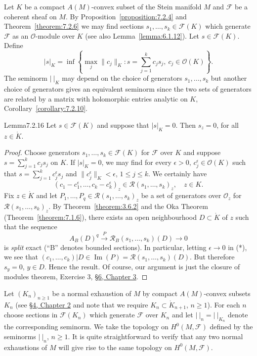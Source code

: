 Let $K$ be a compact $A(M)$-convex subset of the Stein manifold $M$ and $\mathcal F$ be a coherent sheaf on $M$. By Proposition~\ref{proposition:7.2.4} and Theorem~\ref{theorem:7.2.6} we may find sections $s_1,\ldots,s_k\in\mathcal F(K)$ which generate $\mathcal F$ as an $\mathcal O$-module over $K$ (see also Lemma~\ref{lemma:6.1.12}). Let $s\in\mathcal F(K)$. Define
\[
|s|_K=\inf\left\{\max_j\|c_j\|_K:s=\sum_{j=1}^k c_js_j,\ c_j\in\mathcal O(K)\right\}.
\]
The seminorm $|\ | _K$ may depend on the choice of generators $s_1,\ldots,s_k$ but another choice of generators gives an equivalent seminorm since the two sets of generators are related by a matrix with holomorphic entries analytic on $K$, Corollary~\ref{corollary:7.2.10}.
\begin{originaltheorem}{Lemma}{7.2.16}
Let $s\in\mathcal F(K)$ and suppose that $|s|_K=0$. Then $s_z=0$, for all $z\in\mathring K$.
\end{originaltheorem}
\begin{proof}
Choose generators $s_1,\ldots,s_k\in\mathcal F(K)$ for $\mathcal F$ over $K$ and suppose $s=\sum_{j=1}^k c_js_j$ on $K$. If $|s|_K=0$, we may find for every $\epsilon>0$, $c_j^\epsilon\in\mathcal O(K)$ such that $s=\sum_{j=1}^k c_j^\epsilon s_j$ and $\|c_j^\epsilon\|_K<\epsilon$, $1\leq j\leq k$. We certainly have
\[
(c_1-c_1^\epsilon,\ldots,c_k-c_k^\epsilon)_z\in\mathcal R(s_1,\ldots,s_k)_z,\quad z\in K.\tag{*}\label{eq:7:star:3}
\]
Fix $z\in\mathring K$ and let $P_1,\ldots,P_q\in\mathcal R(s_1,\ldots,s_k)_z$ be a set of generators over $\mathcal O_z$ for $\mathcal R(s_1,\ldots,s_k)_z$. By Theorem~\ref{theorem:3.6.2} and the Oka Theorem
(Theorem~\ref{theorem:7.1.6}), there exists an open neighbourhood $D\subset\mathring K$ of $z$ such that the sequence
\[
A_B(D)^q\xrightarrow{P}\mathcal R_B(s_1,\ldots,s_k)(D)\to0
\]
is \emph{split} exact (``B'' denotes bounded sections). In particular, letting $\epsilon\to0$ in (*), we see that $(c_1,\ldots,c_k)|D\in\operatorname{Im}(P)=\mathcal R(s_1,\ldots,s_k)(D)$. But therefore $s_y=0$, $y\in D$. Hence the result. Of course, our argument is just the closure of modules theorem, Exercise 3, \hyperref[sec:3:6]{\S6, Chapter 3}.
\end{proof}
Let $(K_n)_{n\geq1}$ be a normal exhaustion of $M$ by compact $A(M)$-convex subsets $K_n$ (see \hyperref[sec:2:4]{\S4, Chapter 2} and note that we require $K_n\subset\mathring K_{n+1}$, $n\geq1$). For each $n$ choose sections in $\mathcal F(K_n)$ which generate $\mathcal F$ over $K_n$ and let $|\ |_n=|\ |_{K_n}$ denote the corresponding seminorm. We take the topology on $H^0(M,\mathcal F)$ defined by the seminorms $|\ |_n$, $n\geq1$. It is quite straightforward to verify that any two normal exhaustions of $M$ will give rise to the same topology on $H^0(M,\mathcal F)$.
